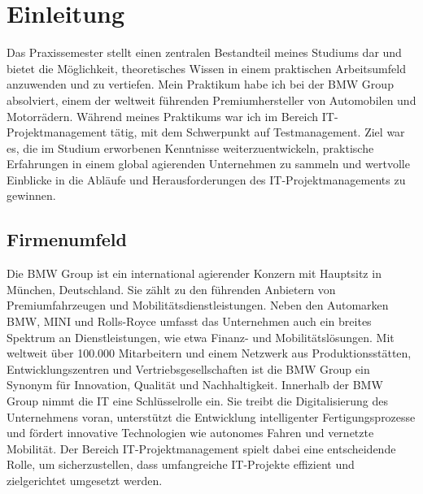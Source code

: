 \section{Einleitung}
Das Praxissemester stellt einen zentralen Bestandteil meines Studiums dar und bietet die Möglichkeit, theoretisches Wissen in einem praktischen Arbeitsumfeld anzuwenden und zu vertiefen. 
Mein Praktikum habe ich bei der BMW Group absolviert, einem der weltweit führenden Premiumhersteller von Automobilen und Motorrädern. 
Während meines Praktikums war ich im Bereich IT-Projektmanagement tätig, mit dem Schwerpunkt auf Testmanagement. 
Ziel war es, die im Studium erworbenen Kenntnisse weiterzuentwickeln, praktische Erfahrungen in einem global agierenden Unternehmen zu sammeln und wertvolle Einblicke in die Abläufe und Herausforderungen des IT-Projektmanagements zu gewinnen.

\subsection{Firmenumfeld}
Die BMW Group ist ein international agierender Konzern mit Hauptsitz in München, Deutschland. 
Sie zählt zu den führenden Anbietern von Premiumfahrzeugen und Mobilitätsdienstleistungen. 
Neben den Automarken BMW, MINI und Rolls-Royce umfasst das Unternehmen auch ein breites Spektrum an Dienstleistungen, wie etwa Finanz- und Mobilitätslösungen. 
Mit weltweit über 100.000 Mitarbeitern und einem Netzwerk aus Produktionsstätten, Entwicklungszentren und Vertriebsgesellschaften ist die BMW Group ein Synonym für Innovation, Qualität und Nachhaltigkeit. 
Innerhalb der BMW Group nimmt die IT eine Schlüsselrolle ein. 
Sie treibt die Digitalisierung des Unternehmens voran, unterstützt die Entwicklung intelligenter Fertigungsprozesse und fördert innovative Technologien wie autonomes Fahren und vernetzte Mobilität. 
Der Bereich IT-Projektmanagement spielt dabei eine entscheidende Rolle, um sicherzustellen, dass umfangreiche IT-Projekte effizient und zielgerichtet umgesetzt werden.

